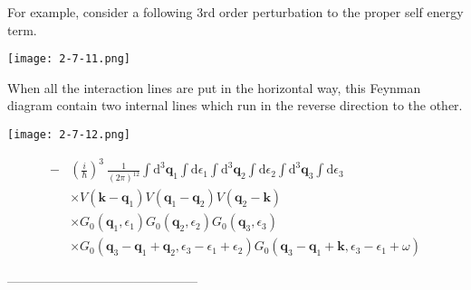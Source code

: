 For example, consider a following 3rd order perturbation to the proper self energy term.
\begin{center}
\label{Fig2.7.11} \texttt{[image: 2-7-11.png]}
\end{center}

When all the interaction lines are put in the horizontal way, this Feynman diagram contain two internal lines which run in the reverse direction to the other.
\begin{center}
\label{Fig2.7.12} \texttt{[image: 2-7-12.png]}
\end{center}

\[ \begin{split}
-&\left(\frac{i}{\hbar}\right)^3 \ \frac{1}{(2\pi)^{12}} \int \mathrm{d}^3 \mathbf{q}_1 \int \mathrm{d} \epsilon_1 \int \mathrm{d}^3 \mathbf{q}_2 \int \mathrm{d} \epsilon_2 \int \mathrm{d}^3 \mathbf{q}_3 \int \mathrm{d} \epsilon_3 \\
&\times V(\mathbf{k}-\mathbf{q}_1)V(\mathbf{q}_1-\mathbf{q}_2)V(\mathbf{q}_2-\mathbf{k})\\
&\times G_0(\mathbf{q}_1,\epsilon_1)G_0(\mathbf{q}_2,\epsilon_2)G_0(\mathbf{q}_3,\epsilon_3)\\
&\times G_0(\mathbf{q}_3-\mathbf{q}_1+\mathbf{q}_2,\epsilon_3-\epsilon_1+\epsilon_2)G_0(\mathbf{q}_3-\mathbf{q}_1+\mathbf{k},\epsilon_3-\epsilon_1+\omega)
\end{split} \]
\begin{center}---------------------------------------------\end{center}
